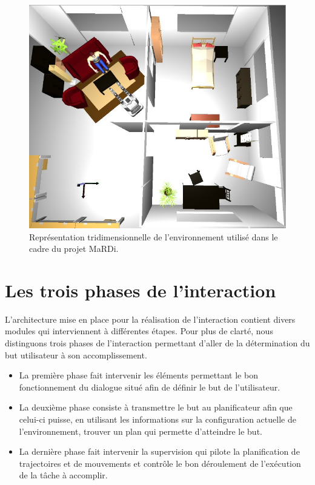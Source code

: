 \documentclass[a4paper,11pt,twoside]{StyleThese}
\begin{document}
\begin{figure}[ht!]
 \centering
  \includegraphics[width=0.89\linewidth]{./img/mardiSetup.jpg} 
  \caption {Représentation tridimensionnelle de l'environnement utilisé dans le cadre du projet MaRDi.}
  \label{fig:env}
\end{figure}


\section{Les trois phases de l'interaction}
\label{sec:troisPhases}



L'architecture mise en place pour la réalisation de l'interaction contient divers modules qui interviennent à différentes étapes.
Pour plus de clarté, nous distinguons trois phases de l'interaction permettant d'aller de la détermination du but utilisateur à son accomplissement. 

\begin{itemize}
\item La première phase fait intervenir les éléments permettant le bon fonctionnement du dialogue situé afin de définir le but de l'utilisateur.
\item La deuxième phase consiste à transmettre le but au planificateur afin que celui-ci puisse, en utilisant les informations sur la configuration actuelle de l'environnement, trouver un plan qui permette d'atteindre le but. 
\item La dernière phase fait intervenir la supervision qui pilote la planification de trajectoires et de mouvements et contrôle le bon déroulement de l'exécution de la tâche à accomplir.
\end{itemize}
\end{document}
